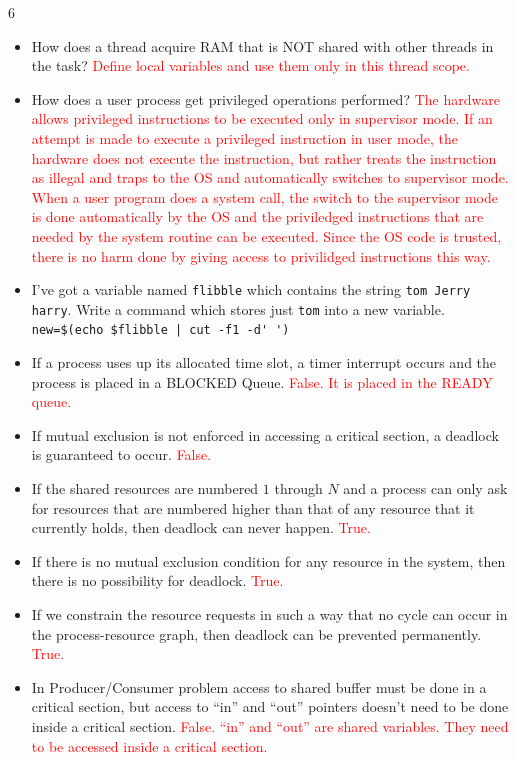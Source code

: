 \documentclass[9pt,landscape]{memoir}
\newcommand{\answer}[1]{\textcolor{red}{#1}}
\begin{document}
\begin{multicols}{6}
\begin{itemize}
    \item How does a thread acquire RAM that is NOT shared with other threads in the task? \answer{Define local variables and use them only in this thread scope.}
    \item How does a user process get privileged operations performed? \answer{The hardware allows privileged instructions to be executed only in supervisor mode. If an attempt is made to execute a privileged instruction in user mode, the hardware does not execute the instruction, but rather treats the instruction as illegal and traps to the OS and automatically switches to supervisor mode. When a user program does a system call, the switch to the supervisor mode is done automatically by the OS and the priviledged instructions that are needed by the system routine can be executed. Since the OS code is trusted, there is no harm done by giving access to privilidged instructions this way.}
    \item I've got a variable named \verb$flibble$ which contains the string \verb$tom Jerry harry$. Write a command which stores just \verb$tom$ into a new variable. \verb|new=$(echo $flibble|\verb$ | cut -f1 -d' ')$
    \item If a process uses up its allocated time slot, a timer interrupt occurs and the process is placed in a BLOCKED Queue.  \answer{False. It is placed in the READY queue.}
    \item If mutual exclusion is not enforced in accessing a critical section, a deadlock is guaranteed to occur. \answer{False.}
    \item If the shared resources are numbered $1$ through $N$ and a process can only ask for resources that are numbered higher than that of any resource that it currently holds, then deadlock can never happen. \answer{True.}
    \item If there is no mutual exclusion condition for any resource in the system, then there is no possibility for deadlock. \answer{True.}
    \item If we constrain the resource requests in such a way that no cycle can occur in the process-resource graph, then deadlock can be prevented permanently. \answer{True.}
    \item In Producer/Consumer problem access to shared buffer must be done in a critical section, but access to ``in'' and ``out'' pointers doesn't need to be done inside a critical section.  \answer{False. ``in'' and ``out'' are shared variables. They need to be accessed inside a critical section.}

\end{itemize}
\end{multicols}
\end{document}
